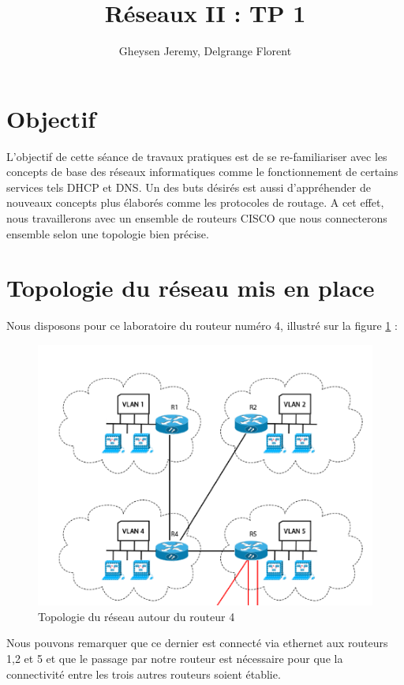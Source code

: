 \documentclass[10pt,a4paper]{article}
\author{Gheysen Jeremy, Delgrange Florent}
\title{Réseaux II : TP 1}
\begin{document}
\maketitle

\section{Objectif}

L'objectif de cette séance de travaux pratiques est de se re-familiariser avec les concepts de base des réseaux informatiques comme le fonctionnement de certains services tels DHCP et DNS. Un des buts désirés est aussi d'appréhender de nouveaux concepts plus élaborés comme les protocoles de routage. A cet effet, nous travaillerons avec un ensemble de routeurs CISCO que nous connecterons ensemble selon une topologie bien précise.  

\section{Topologie du réseau mis en place}

Nous disposons pour ce laboratoire du routeur numéro 4, illustré sur la figure \ref{topol} :

\begin{figure}[h]
\begin{center}
\includegraphics[scale=0.5]{topologie.png}
\caption{Topologie du réseau autour du routeur 4}
\label{topol}
\end{center}
\end{figure}

Nous pouvons remarquer que ce dernier est connecté via ethernet aux routeurs 1,2 et 5 et que le passage par notre routeur est nécessaire pour que la connectivité entre les trois autres routeurs soient établie.
\end{document}
